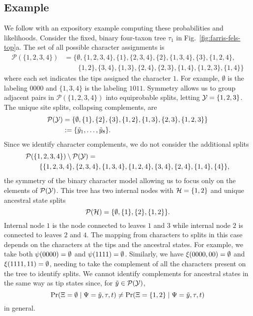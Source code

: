 \subsection*{Example}
We follow with an expository example computing these probabilities and likelihoods.
Consider the fixed, binary four-taxon tree $\tau_1$ in Fig.~\ref{fig:farris-fels-top}a.
The set of all possible character assignments is
\begin{align*}
\mathcal{P}(\{1,2,3,4\}) &= \{\emptyset, \{1,2,3,4\}, \{1\}, \{2,3,4\}, \{2\}, \{1,3,4\}, \{3\}, \{1,2,4\}, \\
                         &\qquad \{1,2\}, \{3,4\}, \{1,3\}, \{2,4\}, \{2,3\}, \{1,4\}, \{1,2,3\}, \{1,4\}\}
\end{align*}
where each set indicates the tips assigned the character $1$.
For example, $\emptyset$ is the labeling $0000$ and $\{1,3,4\}$ is the labeling $1011$.
Symmetry allows us to group adjacent pairs in $\mathcal{P}(\{1,2,3,4\})$ into equiprobable splits, letting $\mathcal{Y}=\{1,2,3\}$.
The unique site splits, collapsing complements, are
\begin{align*}
    \mathcal{P}(\mathcal{Y}) &= \{\emptyset, \{1\}, \{2\}, \{3\}, \{1,2\}, \{1,3\}, \{2,3\}, \{1,2,3\}\} \\
& := \{\tilde{y}_1, \ldots, \tilde{y}_8\}.
\end{align*}
Since we identify character complements, we do not consider the additional splits
\begin{equation*}
\begin{split}
& \mathcal{P}(\{1,2,3,4\}) \setminus \mathcal{P}(\mathcal{Y}) = \\
&\qquad \{\{1,2,3,4\}, \{2,3,4\}, \{1,3,4\}, \{1,2,4\}, \{3,4\}, \{2,4\}, \{1,4\}, \{4\}\},
\end{split}
\end{equation*}
the symmetry of the binary character model allowing us to focus only on the elements of $\mathcal{P}(\mathcal{Y})$.
This tree has two internal nodes with $\mathcal{H}=\{1,2\}$ and unique ancestral state splits
\[
\mathcal{P}(\mathcal{H}) = \{\emptyset, \{1\}, \{2\}, \{1,2\}\}.
\]
Internal node $1$ is the node connected to leaves $1$ and $3$ while internal node $2$ is connected to leaves $2$ and $4$.
The mapping from characters to splits in this case depends on the characters at the tips and the ancestral states.
For example, we take both $\psi(0000)=\emptyset$ and $\psi(1111)=\emptyset$.
Similarly, we have $\xi(0000, 00) = \emptyset$ and $\xi(1111, 11)=\emptyset$, needing to take the complement of all the characters present on the tree to identify splits.
We cannot identify complements for ancestral states in the same way as tip states since, for $\tilde{y}\in\mathcal{P}(\mathcal{Y})$,
\[
\Pr(\Xi=\emptyset \mid \Psi=\tilde{y}, \tau, t)\neq \Pr(\Xi=\{1,2\} \mid \Psi=\tilde{y}, \tau, t)
\]
in general.

